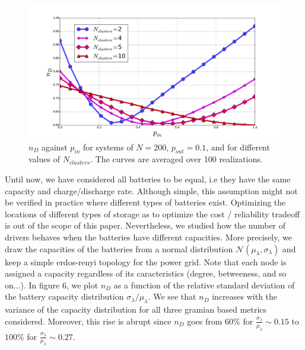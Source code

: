 \documentclass[conference]{IEEEtran}
\begin{document}
\begin{figure}
\label{fig:block_model_2}
\includegraphics[scale=.25]{./figure_6/figure_6}
\caption{$n_D$ against $ p_{in} $ for systems of $N=200 $, $p_{out} = 0.1 $, and for different values of $N_{clusters} $. The curves are averaged over 100 realizations.}
\end{figure}


Until now, we have considered all batteries to be equal, i.e they have the same capacity and charge/discharge rate. Although simple, this assumption might not be verified in practice where different types of batteries exist. Optimizing the locations of different types of storage as to optimize the cost / reliability tradeoff is out of the scope of this paper. Nevertheless, we studied how the number of drivers behaves when the batteries have different capacities. More precisely, we draw the capacities of the batteries from a normal distribution $ \mathcal{N}( \mu_{\lambda}, \sigma_{\lambda} ) $ and keep a simple erdos-renyi topology for the power grid. Note that each node is assigned a capacity regardless of its caracteristics (degree, betweeness, and so on...). In figure 6, we plot $n_D$ as a function of the relative standard deviation of the battery capacity distribution $ \sigma_{\lambda} / \mu_{\lambda} $. We see that $n_D$ increases with the variance of the capacity distribution for all three gramian based metrics considered. Moreover, this rise is abrupt since $n_D$ goes from $ 60 \%$ for $\frac{\sigma_{\lambda}}{\mu_{\lambda}} \sim 0.15 $ to $100 \% $ for $\frac{\sigma_{\lambda}}{\mu_{\lambda}} \sim 0.27 $. 
\end{document}
